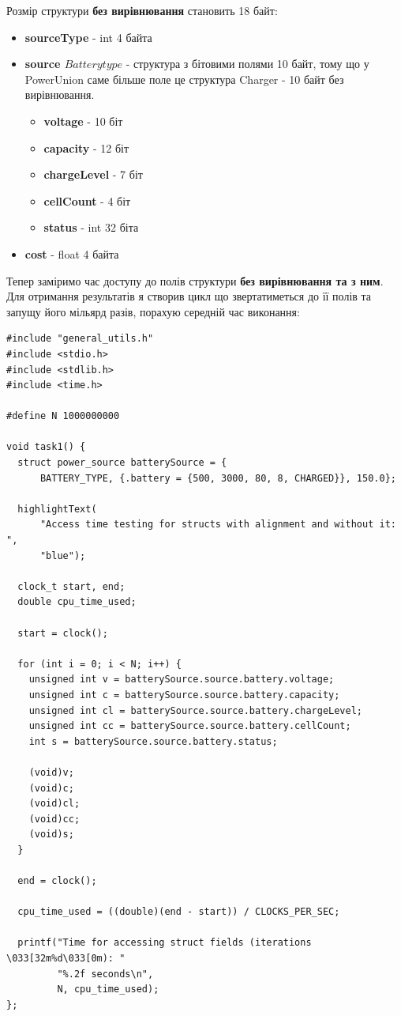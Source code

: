 \clearpage
Розмір структури \textbf{без вирівнювання} становить 18 байт:

\begin{itemize}
    \item \textbf{sourceType} - int 4 байта
    \item \textbf{source \(Battery type\)} - структура з бітовими полями 10 байт, тому що у PowerUnion саме більше поле це структура Charger - 10 байт без вирівнювання.
    \begin{itemize}
        \item \textbf{voltage} - 10 біт
        \item \textbf{capacity} - 12 біт
        \item \textbf{chargeLevel} - 7 біт
        \item \textbf{cellCount} - 4 біт
        \item \textbf{status} - int 32 біта
    \end{itemize}
    \item \textbf{cost} - float 4 байта
\end{itemize}

Тепер заміримо час доступу до полів структури \textbf{без вирівнювання та з ним}. Для отримання результатів я створив цикл що звертатиметься до її полів та запущу його мільярд разів, порахую середній час виконання:

\begin{lstlisting}[style=customc]
#include "general_utils.h"
#include <stdio.h>
#include <stdlib.h>
#include <time.h>

#define N 1000000000

void task1() {
  struct power_source batterySource = {
      BATTERY_TYPE, {.battery = {500, 3000, 80, 8, CHARGED}}, 150.0};

  highlightText(
      "Access time testing for structs with alignment and without it: ",
      "blue");

  clock_t start, end;
  double cpu_time_used;

  start = clock();

  for (int i = 0; i < N; i++) { 
    unsigned int v = batterySource.source.battery.voltage;
    unsigned int c = batterySource.source.battery.capacity;
    unsigned int cl = batterySource.source.battery.chargeLevel;
    unsigned int cc = batterySource.source.battery.cellCount;
    int s = batterySource.source.battery.status;

    (void)v; 
    (void)c;
    (void)cl;
    (void)cc;
    (void)s;
  }

  end = clock();

  cpu_time_used = ((double)(end - start)) / CLOCKS_PER_SEC;

  printf("Time for accessing struct fields (iterations \033[32m%d\033[0m): "
         "%.2f seconds\n",
         N, cpu_time_used);
};
\end{lstlisting}

